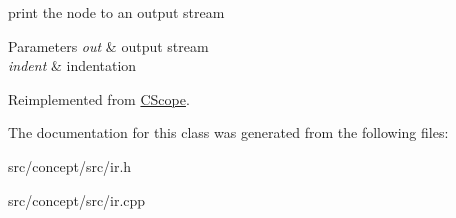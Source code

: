 print the node to an output stream 


\begin{DoxyParams}{Parameters}
{\em out} & output stream \\
\hline
{\em indent} & indentation \\
\hline
\end{DoxyParams}


Reimplemented from \hyperlink{classCScope_a550063ff2ce6eaea39066acd84134556}{C\-Scope}.



The documentation for this class was generated from the following files\-:\begin{DoxyCompactItemize}
\item 
src/concept/src/ir.\-h\item 
src/concept/src/ir.\-cpp\end{DoxyCompactItemize}
